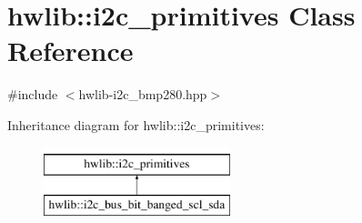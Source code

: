 \hypertarget{classhwlib_1_1i2c__primitives}{}\section{hwlib\+::i2c\+\_\+primitives Class Reference}
\label{classhwlib_1_1i2c__primitives}


{\ttfamily \#include $<$hwlib-\/i2c\+\_\+bmp280.\+hpp$>$}

Inheritance diagram for hwlib\+::i2c\+\_\+primitives\+:\begin{figure}[H]
\begin{center}
\leavevmode
\includegraphics[height=2.000000cm]{classhwlib_1_1i2c__primitives}
\end{center}
\end{figure}
